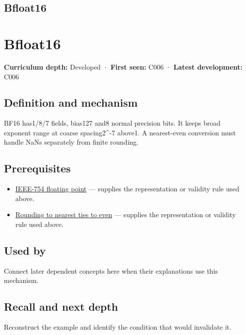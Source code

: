 \hypertarget{appendix-18b8dd966b5d}{}
\section*{Bfloat16}
\chapter{Bfloat16}\label{appendix-18b8dd966b5d-bfloat16}

\textbf{Curriculum depth:} Developed · \textbf{First seen:} C006 · \textbf{Latest development:} C006

\section{Definition and mechanism}\label{appendix-18b8dd966b5d-definition-and-mechanism}

BF16 has1/8/7 fields, bias127 and8 normal precision bits. It keeps broad exponent range at coarse spacing2\^{}-7 above1. A nearest-even conversion must handle NaNs separately from finite rounding.

\section{Prerequisites}\label{appendix-18b8dd966b5d-prerequisites}

\begin{itemize}
\tightlist
\item
  \hyperref[appendix-343615f49ddf]{IEEE-754 floating point} --- supplies the representation or validity rule used above.
\item
  \hyperref[appendix-614afe1de592]{Rounding to nearest ties to even} --- supplies the representation or validity rule used above.
\end{itemize}

\section{Used by}\label{appendix-18b8dd966b5d-used-by}

Connect later dependent concepts here when their explanations use this mechanism.

\section{Recall and next depth}\label{appendix-18b8dd966b5d-recall-and-next-depth}

Reconstruct the example and identify the condition that would invalidate it.

